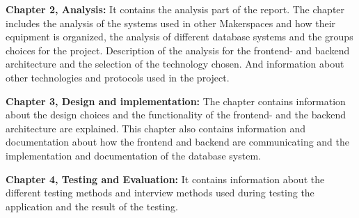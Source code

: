 \textbf{Chapter 2, Analysis:}
It contains the analysis part of the report. The chapter includes the analysis of the systems used in other Makerspaces and how their equipment is organized, the analysis of different database systems and the groups choices for the project. Description of the analysis for the frontend- and backend architecture and the selection of the technology chosen. And information about other technologies and protocols used in the project.

\textbf{Chapter 3, Design and implementation:}
The chapter contains information about the design choices and the functionality of the frontend- and the backend architecture are explained. This chapter also contains information and documentation about how the frontend and backend are communicating and the implementation and documentation of the database system.

\textbf{Chapter 4, Testing and Evaluation:}
It contains information about the different testing methods and interview methods used during testing the application and the result of the testing.

